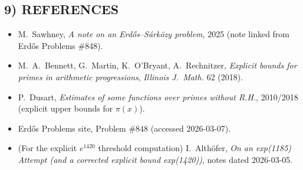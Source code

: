 \subsection*{9) REFERENCES}
\begin{itemize}
\item M.\ Sawhney, \emph{A note on an Erd\H{o}s--S\'ark\"{o}zy problem}, 2025 (note linked from Erd\H{o}s Problems \#848).
\item M.\ A.\ Bennett, G.\ Martin, K.\ O'Bryant, A.\ Rechnitzer, \emph{Explicit bounds for primes in arithmetic progressions}, \emph{Illinois J.\ Math.} 62 (2018).
\item P.\ Dusart, \emph{Estimates of some functions over primes without R.H.}, 2010/2018 (explicit upper bounds for $\pi(x)$).
\item Erd\H{o}s Problems site, Problem \#848 (accessed 2026-03-07).
\item (For the explicit $e^{1420}$ threshold computation) I.\ Alth\"ofer, \emph{On an exp(1185) Attempt (and a corrected explicit bound exp(1420))}, notes dated 2026-03-05.
\end{itemize}

